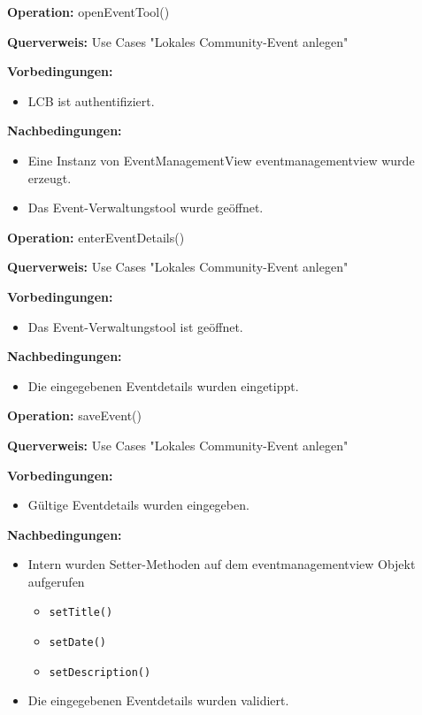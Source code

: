 \documentclass[a4paper,12pt]{article}
\begin{document}
	\begin{contractbox}
		\textbf{Operation:} openEventTool()
		
		\textbf{Querverweis:} Use Cases "Lokales Community-Event anlegen"
		
		\textbf{Vorbedingungen:}
		\begin{itemize}[noitemsep]
			\item LCB ist authentifiziert.
		\end{itemize}
		
		\textbf{Nachbedingungen:}
		\begin{itemize}[noitemsep]
			\item Eine Instanz von EventManagementView  eventmanagementview wurde erzeugt.
			\item Das Event-Verwaltungstool wurde geöffnet.
		\end{itemize}
	\end{contractbox}
	
	\begin{contractbox}
		\textbf{Operation:} enterEventDetails()
		
		\textbf{Querverweis:} Use Cases "Lokales Community-Event anlegen"
		
		\textbf{Vorbedingungen:}
		\begin{itemize}[noitemsep]
			\item Das Event-Verwaltungstool ist geöffnet.
		\end{itemize}
		
		\textbf{Nachbedingungen:}
		\begin{itemize}[noitemsep] 
			\item Die eingegebenen Eventdetails wurden eingetippt.
		\end{itemize}
	\end{contractbox}
	
	
	
	\begin{contractbox}
		\textbf{Operation:} saveEvent()
		
		\textbf{Querverweis:} Use Cases "Lokales Community-Event anlegen"
		
		\textbf{Vorbedingungen:}
		\begin{itemize}[noitemsep]
			\item Gültige Eventdetails wurden eingegeben.
		\end{itemize}
		
		\textbf{Nachbedingungen:}
		\begin{itemize}[noitemsep]
			\item Intern wurden Setter-Methoden auf dem eventmanagementview Objekt aufgerufen
			\begin{itemize}[noitemsep]
				\item \texttt{setTitle()}
				\item \texttt{setDate()}
				\item \texttt{setDescription()}
			\end{itemize}
			\item Die eingegebenen Eventdetails wurden validiert.
		\end{itemize}
	\end{contractbox}
	
\end{document}
